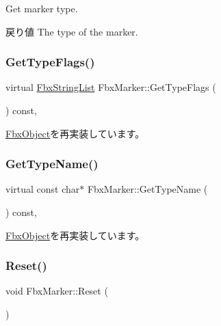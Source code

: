 Get marker type. \begin{DoxyReturn}{戻り値}
The type of the marker. 
\end{DoxyReturn}
\mbox{\label{class_fbx_marker_aba200b5397b2fe0397e782ea0a602890}} 
\subsubsection{\texorpdfstring{Get\+Type\+Flags()}{GetTypeFlags()}}
{\footnotesize\ttfamily virtual \hyperlink{class_fbx_string_list}{Fbx\+String\+List} Fbx\+Marker\+::\+Get\+Type\+Flags (\begin{DoxyParamCaption}{ }\end{DoxyParamCaption}) const\hspace{0.3cm}{\ttfamily [protected]}, {\ttfamily [virtual]}}



\hyperlink{class_fbx_object_a6d30a5d00400039a248977cf9f9255b2}{Fbx\+Object}を再実装しています。

\mbox{\label{class_fbx_marker_a8418dc0f13a8197949a412604787c60d}} 
\subsubsection{\texorpdfstring{Get\+Type\+Name()}{GetTypeName()}}
{\footnotesize\ttfamily virtual const char$\ast$ Fbx\+Marker\+::\+Get\+Type\+Name (\begin{DoxyParamCaption}{ }\end{DoxyParamCaption}) const\hspace{0.3cm}{\ttfamily [protected]}, {\ttfamily [virtual]}}



\hyperlink{class_fbx_object_a817dcfa8f7f7e2437324e1e71377c4b2}{Fbx\+Object}を再実装しています。

\mbox{\label{class_fbx_marker_aec39701adcdce372adbd766c7d21f3f1}} 
\subsubsection{\texorpdfstring{Reset()}{Reset()}}
{\footnotesize\ttfamily void Fbx\+Marker\+::\+Reset (\begin{DoxyParamCaption}{ }\end{DoxyParamCaption})}



